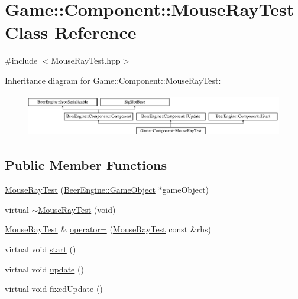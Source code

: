 \hypertarget{class_game_1_1_component_1_1_mouse_ray_test}{}\section{Game\+:\+:Component\+:\+:Mouse\+Ray\+Test Class Reference}
\label{class_game_1_1_component_1_1_mouse_ray_test}


{\ttfamily \#include $<$Mouse\+Ray\+Test.\+hpp$>$}

Inheritance diagram for Game\+:\+:Component\+:\+:Mouse\+Ray\+Test\+:\begin{figure}[H]
\begin{center}
\leavevmode
\includegraphics[height=1.875000cm]{class_game_1_1_component_1_1_mouse_ray_test}
\end{center}
\end{figure}
\subsection*{Public Member Functions}
\begin{DoxyCompactItemize}
\item 
\mbox{\hyperlink{class_game_1_1_component_1_1_mouse_ray_test_a99877b8b30c5523e5ccd69998fcbf866}{Mouse\+Ray\+Test}} (\mbox{\hyperlink{class_beer_engine_1_1_game_object}{Beer\+Engine\+::\+Game\+Object}} $\ast$game\+Object)
\item 
virtual \mbox{\hyperlink{class_game_1_1_component_1_1_mouse_ray_test_ad20ea199276f520e5d18adf17cea8293}{$\sim$\+Mouse\+Ray\+Test}} (void)
\item 
\mbox{\hyperlink{class_game_1_1_component_1_1_mouse_ray_test}{Mouse\+Ray\+Test}} \& \mbox{\hyperlink{class_game_1_1_component_1_1_mouse_ray_test_adf6a006015555e1754ec1948bc10637b}{operator=}} (\mbox{\hyperlink{class_game_1_1_component_1_1_mouse_ray_test}{Mouse\+Ray\+Test}} const \&rhs)
\item 
virtual void \mbox{\hyperlink{class_game_1_1_component_1_1_mouse_ray_test_ae0d25b167dd28084ddd677b0593a54f3}{start}} ()
\item 
virtual void \mbox{\hyperlink{class_game_1_1_component_1_1_mouse_ray_test_af5bf853e25dd4e70386dfecd4dc7dab9}{update}} ()
\item 
virtual void \mbox{\hyperlink{class_game_1_1_component_1_1_mouse_ray_test_a71fe0d523b05a8d42c7c79101ea5ad18}{fixed\+Update}} ()
\end{DoxyCompactItemize}
